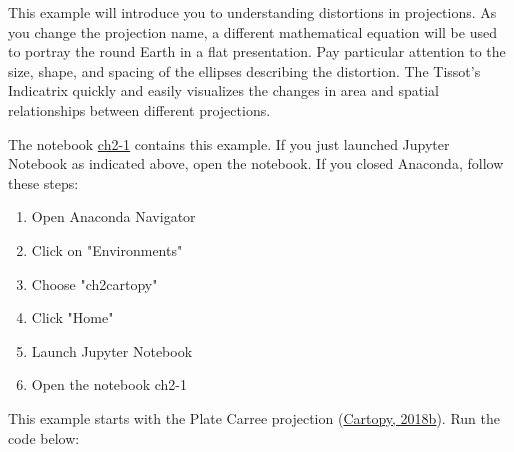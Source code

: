 \documentclass[a4paper , 12pt]{book}
\begin{document}
This example will introduce you to understanding distortions in projections. As you change the projection name, a different mathematical equation will be used to portray the round Earth in a flat presentation. Pay particular attention to the size, shape, and spacing of the ellipses describing the distortion. The Tissot’s Indicatrix quickly and easily visualizes the changes in area and spatial relationships between different projections.

The notebook \href{https://github.com/nfcd/compGeo/blob/master/source/notebooks/ch2-1.ipynb}{ch2-1} contains this example. If you just launched Jupyter Notebook as indicated above, open the notebook. If you closed Anaconda, follow these steps:

\begin{enumerate}
    \item Open Anaconda Navigator
    \item Click on "Environments"
    \item Choose "ch2cartopy"
    \item Click "Home"
    \item Launch Jupyter Notebook
    \item Open the notebook ch2-1
\end{enumerate}{}

This example starts with the Plate Carree projection (\href{https://scitools.org.uk/cartopy/docs/latest/gallery/tissot.html}{Cartopy, 2018b}). Run the code below:
\end{document}
